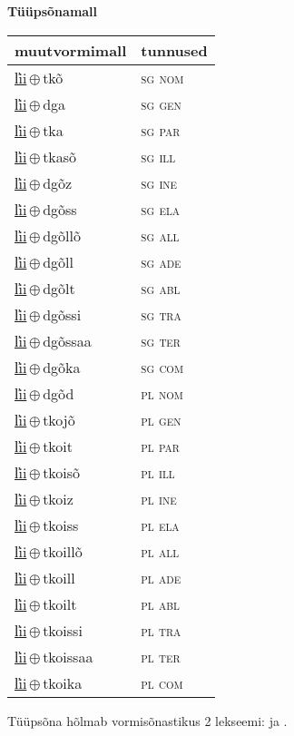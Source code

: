 

\vspace{3.5em}
\noindent \begin{minipage}{\textwidth}
\noindent \textbf{Tüüpsõnamall \,}\\

\begin{sideways}
\begin{tabular}{l l}
muutvormimall & tunnused \\
\hline
\underline{l̕ii}\,$\oplus$\,tkõ & \textsc{ sg nom } \\
\underline{l̕ii}\,$\oplus$\,dga & \textsc{ sg gen } \\
\underline{l̕ii}\,$\oplus$\,tka & \textsc{ sg par } \\
\underline{l̕ii}\,$\oplus$\,tkasõ & \textsc{ sg ill } \\
\underline{l̕ii}\,$\oplus$\,dgõz & \textsc{ sg ine } \\
\underline{l̕ii}\,$\oplus$\,dgõss & \textsc{ sg ela } \\
\underline{l̕ii}\,$\oplus$\,dgõllõ & \textsc{ sg all } \\
\underline{l̕ii}\,$\oplus$\,dgõll & \textsc{ sg ade } \\
\underline{l̕ii}\,$\oplus$\,dgõlt & \textsc{ sg abl } \\
\underline{l̕ii}\,$\oplus$\,dgõssi & \textsc{ sg tra } \\
\underline{l̕ii}\,$\oplus$\,dgõssaa & \textsc{ sg ter } \\
\underline{l̕ii}\,$\oplus$\,dgõka & \textsc{ sg com } \\
\underline{l̕ii}\,$\oplus$\,dgõd & \textsc{ pl nom } \\
\underline{l̕ii}\,$\oplus$\,tkojõ & \textsc{ pl gen } \\
\underline{l̕ii}\,$\oplus$\,tkoit & \textsc{ pl par } \\
\underline{l̕ii}\,$\oplus$\,tkoisõ & \textsc{ pl ill } \\
\underline{l̕ii}\,$\oplus$\,tkoiz & \textsc{ pl ine } \\
\underline{l̕ii}\,$\oplus$\,tkoiss & \textsc{ pl ela } \\
\underline{l̕ii}\,$\oplus$\,tkoillõ & \textsc{ pl all } \\
\underline{l̕ii}\,$\oplus$\,tkoill & \textsc{ pl ade } \\
\underline{l̕ii}\,$\oplus$\,tkoilt & \textsc{ pl abl } \\
\underline{l̕ii}\,$\oplus$\,tkoissi & \textsc{ pl tra } \\
\underline{l̕ii}\,$\oplus$\,tkoissaa & \textsc{ pl ter } \\
\underline{l̕ii}\,$\oplus$\,tkoika & \textsc{ pl com } \\
\end{tabular}
\end{sideways}
\label{tab:tüüpsõnamall-l̕iitkõ}

\end{minipage}

 
\vspace{1em}
\noindent Tüüpsõna hõlmab vormisõnastikus 2 lekseemi:  ja .
